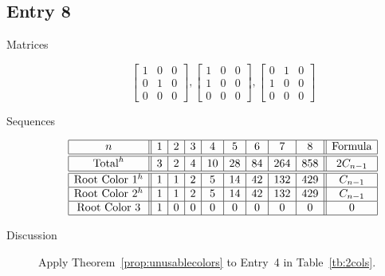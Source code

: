 \documentclass[12pt]{amsart}
\begin{document}
\subsection*{Entry 8}
\begin{description}
    \item[Matrices]
    
    \[\begin{bmatrix}
1 & 0 & 0 \\
0 & 1 & 0 \\
0 & 0 & 0
\end{bmatrix}, \begin{bmatrix}
1 & 0 & 0 \\
1 & 0 & 0 \\
0 & 0 & 0
\end{bmatrix}, \begin{bmatrix}
0 & 1 & 0 \\
1 & 0 & 0 \\
0 & 0 & 0
\end{bmatrix}\]
    \item[Sequences]\hspace*{\fill}\vspace{-0.5cm}
    \begin{center}
        \[
        \begin{array}{|c||c|c|c|c|c|c|c|c||c|}\hline
           n  & 1 & 2 & 3 & 4 & 5 & 6 & 7 & 8  & \text{Formula}\\\hline\hline
           \text{Total}^h  & 3 & 2 & 4 & 10 & 28 & 84 & 264 & 858 & 2C_{n-1}\\\hline\hline
           \text{Root Color }1^h & 1 & 1 & 2 & 5 & 14 & 42 & 132 & 429 & C_{n-1}\\\hline
           \text{Root Color }2^h & 1 & 1 & 2 & 5 & 14 & 42 & 132 & 429 & C_{n-1}\\\hline
           \text{Root Color }3 & 1 & 0 & 0 & 0 & 0 & 0 & 0 & 0 & 0\\\hline
        \end{array}
        \]
    \end{center}
    
    
    \item[Discussion] 
    Apply Theorem~\ref{prop:unusablecolors} to Entry~4 in Table~\ref{tb:2cols}.
\end{description}
\end{document}
